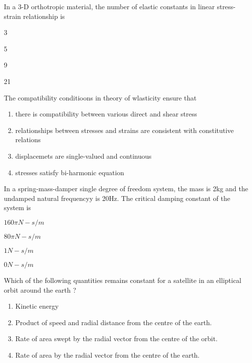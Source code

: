 \iffalse
\title{Gate Questions 2}
\author{EE24BTECH11012 - Bhavanisankar G S}
\section{ae}
\chapter{2008}
\fi
	\item In a 3-D orthotropic material, the number of elastic constants in linear stress-strain relationship is
		\begin{enumerate}
		\end{enumerate}
	\item The compatibility conditioons in theory of wlasticity ensure that
		\begin{enumerate}
			\item there is compatibility between various direct and shear stress
			\item relationships between stresses and strains are consistent with constitutive relations
			\item displacemets are single-valued and continuous
			\item stresses satisfy bi-harmonic equation
		\end{enumerate}
	\item In a spring-mass-damper single degree of freedom system, the mass is 2kg and the undamped natural frequencyy is 20Hz. The critical damping constant of the system is
		\begin{enumerate}
				\begin{multicols}{4}
				\item $ 160 \pi N-s/m $
				\item $ 80 \pi N-s/m $
				\item $ 1 N-s/m $
				\item $ 0 N-s/m $
				\end{multicols}
		\end{enumerate}
	\item Which of the following quantities remains constant for a satellite in an elliptical orbit around the earth ?
		\begin{enumerate}
			\item Kinetic energy
			\item Product of speed and radial distance from the centre of the earth.
			\item Rate of area swept by the radial vector from the centre of the orbit.
			\item Rate of area by the radial vector from the centre of the earth.
		\end{enumerate}
